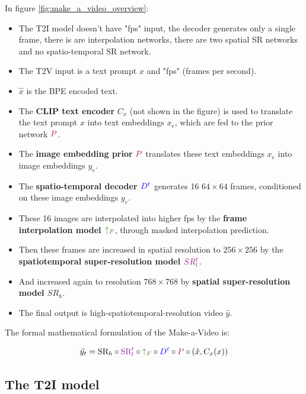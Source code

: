 In figure \ref{fig:make_a_video_overview}:

\begin{itemize}
    \item The T2I model doesn't have "fps" input, the decoder generates only a single frame, there is are interpolation networks, there are two spatial SR networks and no spatio-temporal SR network.
    \item The T2V input is a text prompt $x$ and "fps" (frames per second).
    \item $\hat{x}$ is the BPE encoded text.
    \item The \textbf{CLIP text encoder} $C_x$ (not shown in the figure) is used to translate the text prompt $x$ into text embeddings $x_e$, which are fed to the prior network $\textcolor{Maroon}{P}$.
    \item The \textbf{image embedding prior} $\textcolor{Maroon}{P}$ translates these text embeddings $x_e$ into image embeddings $y_e$.
    \item The \textbf{spatio-temporal decoder $\textcolor{blue}{D^t}$} generates 16 $64\times 64$ frames, conditioned on these image embeddings $y_e$.
    \item These 16 images are interpolated into higher fps by the \textbf{frame interpolation model $\textcolor{OliveGreen}{\uparrow_F}$}, through masked interpolation prediction.
    \item Then these frames are increased in spatial resolution to $256\times 256$ by the \textbf{spatiotemporal super-resolution model $\textcolor{Plum}{SR_l^t}$}.
    \item And increased again to resolution $768\times 768$ by \textbf{spatial super-resolution model $SR_h$}. 
    \item The final output is high-spatiotemporal-resolution video $\hat{y}$.
\end{itemize}

The formal mathematical formulation of the Make-a-Video is:

\begin{equation}
    \hat{y_t} = \text{SR}_h \circ \textcolor{Plum}{\text{SR}_l^t} \circ \textcolor{OliveGreen}{\uparrow_F} \circ \textcolor{blue}{D^t} \circ \textcolor{Maroon}{P} \circ \left( \hat{x}, C_x (x) \right)
    \label{eq:make_a_video_inference}
\end{equation}







\subsection{The T2I model}


